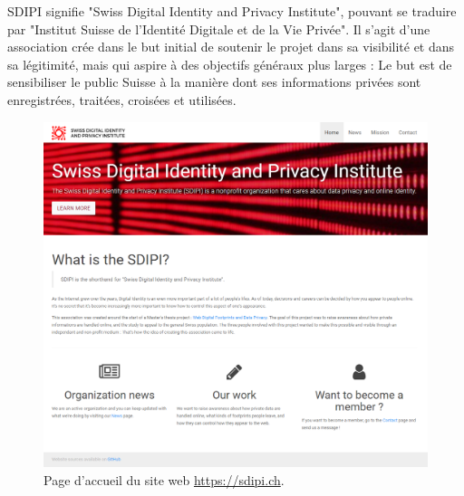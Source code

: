 SDIPI signifie "Swiss Digital Identity and Privacy Institute", pouvant se traduire par "Institut Suisse de l'Identité Digitale et de la Vie Privée". Il s'agit d'une association crée dans le but initial de soutenir le projet dans sa visibilité et dans sa légitimité, mais qui aspire à des objectifs généraux plus larges : Le but est de sensibiliser le public Suisse à la manière dont ses informations privées sont  enregistrées, traitées, croisées et utilisées.

\begin{figure}[h]
	\centering
	\includegraphics[width=1\textwidth]{images/design/sdipi_home}
	\caption{Page d'accueil du site web \url{https://sdipi.ch}.}
	\label{a-sdipi}
\end{figure}